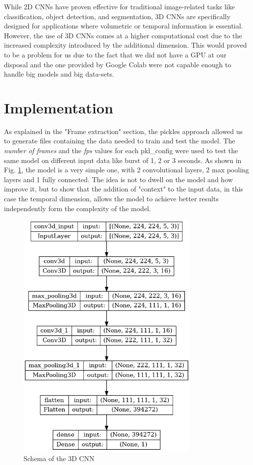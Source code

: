 While 2D CNNs have proven effective for traditional image-related tasks like classification, object detection, and segmentation, 3D CNNs are specifically designed for applications where volumetric or temporal information is essential. However, the use of 3D CNNs comes at a higher computational cost due to the increased complexity introduced by the additional dimension. This would proved to be a problem for us due to the fact that we did not have a GPU at our disposal and the one provided by Google Colab were not capable enough to handle big models and big data-sets.

\section{Implementation}
As explained in the "Frame extraction" section, the pickles approach allowed us to generate files containing the data needed to train and test the model. The \textit{number of frames} and the \textit{fps} values for each pkl\_config were used to test the same model on different input data like burst of 1, 2 or 3 seconds. As shown in Fig. \ref{fig:3DCNNschema}, the model is a very simple one, with 2 convolutional layers, 2 max pooling layers and 1 fully connected. The idea is not to dwell on the model and how improve it, but to show that the addition of "context" to the input data, in this case the temporal dimension, allows the model to achieve better results independently form the complexity of the model.
\begin{figure}[]
    \centering
    \includegraphics[width=0.8\textwidth, height=0.6\textwidth, keepaspectratio]{images/3D9CNNschema.png}
    \caption{Schema of the 3D CNN}
    \label{fig:3DCNNschema}
\end{figure}

